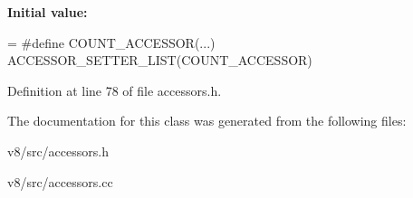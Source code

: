 {\bfseries Initial value\+:}
\begin{DoxyCode}
=
\textcolor{preprocessor}{#define COUNT\_ACCESSOR(...) }
\textcolor{preprocessor}{      ACCESSOR\_SETTER\_LIST(COUNT\_ACCESSOR)}
\end{DoxyCode}


Definition at line 78 of file accessors.\+h.



The documentation for this class was generated from the following files\+:\begin{DoxyCompactItemize}
\item 
v8/src/accessors.\+h\item 
v8/src/accessors.\+cc\end{DoxyCompactItemize}

